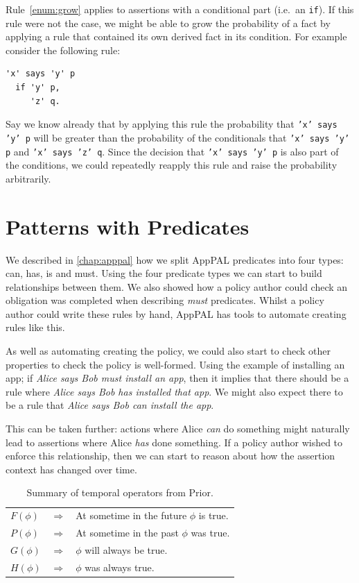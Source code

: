\documentclass[thesis.tex]{subfiles}
\begin{document}
Rule~\ref{enum:grow} applies to assertions with a conditional part (i.e.~an
\texttt{if}). If this rule were not the case, we might be able to grow the
probability of a fact by applying a rule that contained its own derived fact in
its condition. For example consider the following rule:
\begin{lstlisting}
'x' says 'y' p
  if 'y' p,
     'z' q.
\end{lstlisting} Say we know already that by applying this rule the probability
that \texttt{'x' says 'y' p} will be greater than the probability of the
conditionals that \texttt{'x' says 'y' p} and \texttt{'x' says 'z' q}. Since the
decision that \texttt{'x' says 'y' p} is also part of the conditions, we could
repeatedly reapply this rule and raise the probability arbitrarily.

\section{Patterns with Predicates}
\label{sec:patterns-with-predicates}

We described in \autoref{chap:apppal} how we split AppPAL predicates into four types: can, has, is and must.
Using the four predicate types we can start to build relationships between them.
We also showed how a policy author could check an obligation was completed when
describing \emph{must} predicates.  Whilst a policy author could write these
rules by hand, AppPAL has tools to automate creating rules like this.

As well as automating creating the policy, we could also start to check other
properties to check the policy is well-formed. Using the example of installing
an app; if \emph{Alice says Bob must install
  an app}, then it implies that there should be a rule where \emph{Alice says
Bob has installed that app}.  We might also expect there to be a rule that
\emph{Alice says Bob can install the app}.

This can be taken further: actions where Alice \emph{can} do something might
naturally lead to assertions where Alice \emph{has} done something.  If a policy
author wished to enforce this relationship, then we can start to reason about how the
assertion context has changed over time.

\begin{table}\centering
 \begin{tabular}{l c l}
   \toprule
     $F(\phi)$ & $\Rightarrow$ & At sometime in the future $\phi$ is true. \\
     $P(\phi)$ & $\Rightarrow$ & At sometime in the past $\phi$ was true. \\
     $G(\phi)$ & $\Rightarrow$ & $\phi$ will always be true. \\
     $H(\phi)$ & $\Rightarrow$ & $\phi$ was always true. \\
   \bottomrule
 \end{tabular}
 \caption{Summary of temporal operators from Prior.}
 \label{tab:temporal-operators}
\end{table}
\end{document}

